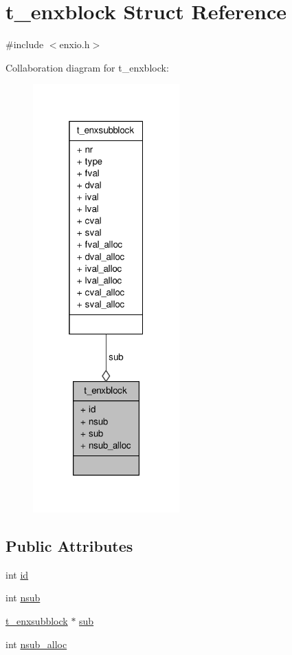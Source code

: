 \hypertarget{structt__enxblock}{\section{t\-\_\-enxblock \-Struct \-Reference}
\label{structt__enxblock}
}


{\ttfamily \#include $<$enxio.\-h$>$}



\-Collaboration diagram for t\-\_\-enxblock\-:
\nopagebreak
\begin{figure}[H]
\begin{center}
\leavevmode
\includegraphics[width=160pt]{structt__enxblock__coll__graph}
\end{center}
\end{figure}
\subsection*{\-Public \-Attributes}
\begin{DoxyCompactItemize}
\item 
int \hyperlink{structt__enxblock_adff25f8b2ea48bec620bbb19e90fa8e3}{id}
\item 
int \hyperlink{structt__enxblock_acbd759e02f7b519df4af7d64df6debbb}{nsub}
\item 
\hyperlink{structt__enxsubblock}{t\-\_\-enxsubblock} $\ast$ \hyperlink{structt__enxblock_aae8941ff913b3f0b9ba18650d3f51b23}{sub}
\item 
int \hyperlink{structt__enxblock_a155a35dc626554195798243ee01df3bb}{nsub\-\_\-alloc}
\end{DoxyCompactItemize}


